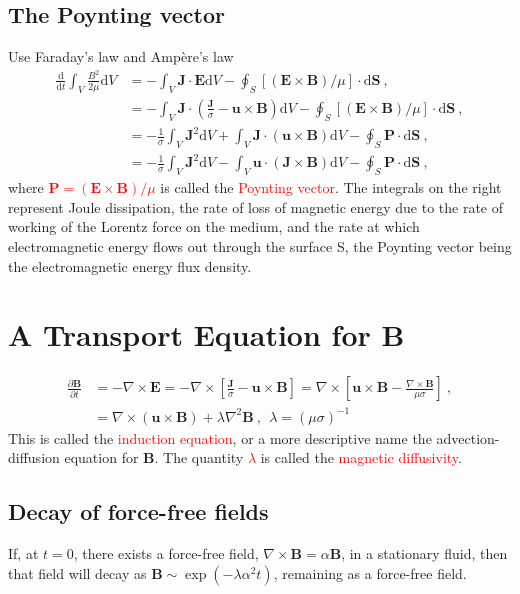 \documentclass[12pt,a4paper]{article}
\renewcommand{\vec}[1]{\boldsymbol{#1}}
\newcommand{\dif}{\mathrm{d}}
\begin{document}
\subsection{The Poynting vector}
Use Faraday's law and Amp\`ere's law
\begin{align}
\frac{\dif }{\dif t} \int_V \frac{B^2}{2\mu} \dif V &= -\int_V \vec{J}\cdot \vec{E} \dif V -\oint_S [(\vec{E} \times \vec{B})/\mu] \cdot \dif \vec{S} ~, \\
&= -\int_V \vec{J}\cdot \left(\frac{\vec{J}}{\sigma} -\vec{u} \times \vec{B} \right) \dif V -\oint_S [(\vec{E} \times \vec{B})/\mu] \cdot \dif \vec{S} ~, \\
&= -\frac{1}{\sigma} \int_V \vec{J}^2 \dif V +\int_V \vec{J}\cdot (\vec{u} \times \vec{B}) \dif V -\oint_S \vec{P} \cdot \dif \vec{S} ~, \\
&= -\frac{1}{\sigma} \int_V \vec{J}^2 \dif V -\int_V \vec{u}\cdot (\vec{J} \times \vec{B}) \dif V -\oint_S \vec{P} \cdot \dif \vec{S} ~,
\end{align}
where \textcolor{red}{$\vec{P} = (\vec{E} \times \vec{B})/\mu$} is called the \textcolor{red}{Poynting vector}. The integrals on the right represent Joule dissipation, the rate of loss of magnetic energy due to the rate of working of the Lorentz force on the medium, and the rate at which electromagnetic energy flows out through the surface S, the Poynting vector being the electromagnetic energy flux density.

\section{A Transport Equation for B}
\begin{align}
\nonumber \frac{\partial \vec{B}}{\partial t} &= -\nabla \times \vec{E} = -\nabla \times \left[\frac{\vec{J}}{\sigma} -\vec{u}\times \vec{B} \right] = \nabla \times \left[\vec{u}\times \vec{B} -\frac{\nabla \times \vec{B}}{\mu \sigma} \right] ~,\\
&= \nabla \times (\vec{u}\times \vec{B}) +\lambda \nabla^2 \vec{B} ~, ~~ \lambda = (\mu \sigma)^{-1}
\end{align}
This is called the \textcolor{red}{induction equation}, or a more descriptive name the advection-diffusion equation for $\vec{B}$. The quantity \textcolor{red}{$\lambda$} is called the \textcolor{red}{magnetic diffusivity}. 

\subsection{Decay of force-free fields}
 If, at $t = 0$, there exists a force-free field, $\nabla \times \vec{B} = \alpha \vec{B}$, in a stationary fluid, then that field will decay as $\vec{B} \sim \exp(-\lambda \alpha^2 t)$, remaining as a force-free field.
\end{document}
